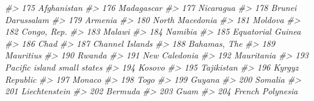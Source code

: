\documentclass[
  xelatex, ja=standard]{bxjsbook}
\newenvironment{Shaded}{\begin{snugshade}}{\end{snugshade}}
\newcommand{\CommentTok}[1]{\textcolor[rgb]{0.56,0.35,0.01}{\textit{#1}}}
\theoremstyle{definition}
\theoremstyle{definition}
\theoremstyle{definition}
\theoremstyle{definition}
\theoremstyle{remark}
\begin{document}
\begin{Shaded}
\begin{Highlighting}[]
\CommentTok{\#\textgreater{} 175                                          Afghanistan}
\CommentTok{\#\textgreater{} 176                                           Madagascar}
\CommentTok{\#\textgreater{} 177                                            Nicaragua}
\CommentTok{\#\textgreater{} 178                                    Brunei Darussalam}
\CommentTok{\#\textgreater{} 179                                              Armenia}
\CommentTok{\#\textgreater{} 180                                      North Macedonia}
\CommentTok{\#\textgreater{} 181                                              Moldova}
\CommentTok{\#\textgreater{} 182                                          Congo, Rep.}
\CommentTok{\#\textgreater{} 183                                               Malawi}
\CommentTok{\#\textgreater{} 184                                              Namibia}
\CommentTok{\#\textgreater{} 185                                    Equatorial Guinea}
\CommentTok{\#\textgreater{} 186                                                 Chad}
\CommentTok{\#\textgreater{} 187                                      Channel Islands}
\CommentTok{\#\textgreater{} 188                                         Bahamas, The}
\CommentTok{\#\textgreater{} 189                                            Mauritius}
\CommentTok{\#\textgreater{} 190                                               Rwanda}
\CommentTok{\#\textgreater{} 191                                        New Caledonia}
\CommentTok{\#\textgreater{} 192                                           Mauritania}
\CommentTok{\#\textgreater{} 193                          Pacific island small states}
\CommentTok{\#\textgreater{} 194                                               Kosovo}
\CommentTok{\#\textgreater{} 195                                           Tajikistan}
\CommentTok{\#\textgreater{} 196                                      Kyrgyz Republic}
\CommentTok{\#\textgreater{} 197                                               Monaco}
\CommentTok{\#\textgreater{} 198                                                 Togo}
\CommentTok{\#\textgreater{} 199                                               Guyana}
\CommentTok{\#\textgreater{} 200                                              Somalia}
\CommentTok{\#\textgreater{} 201                                        Liechtenstein}
\CommentTok{\#\textgreater{} 202                                              Bermuda}
\CommentTok{\#\textgreater{} 203                                                 Guam}
\CommentTok{\#\textgreater{} 204                                     French Polynesia}

\end{Highlighting}
\end{Shaded}
\end{document}
